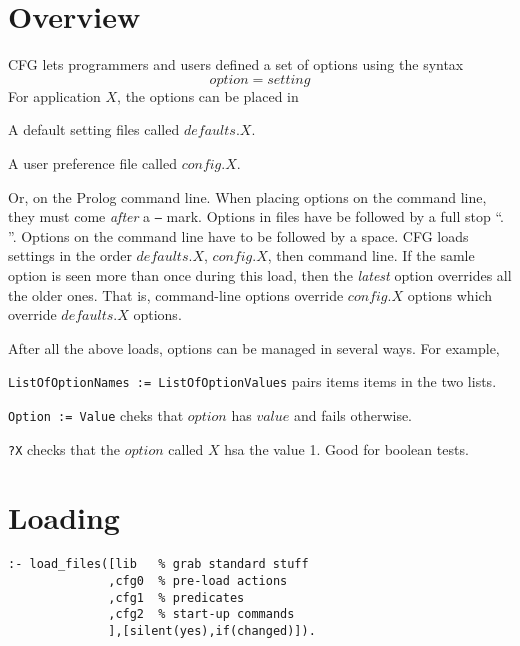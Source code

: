 \documentclass[twocolumn,global]{svjour}
\begin{document}
	 

\section{ Overview}

CFG lets programmers and users
defined a set of options using the syntax
\[
option = setting
\]
For application $X$, the options can be placed
in
\bi
\item
A default setting files called $defaults.X$.
\item
A user preference file called $config.X$.
\item
Or, on the  Prolog
command line. When placing options on the
command line, they must come {\em after}
a {\tt --} mark.
\ei Options in files have be followed by a
full stop ``. ''. Options on the command line
have to be followed by a space.
CFG loads settings in the order $defaults.X$,
	$config.X$, then command line.
If the samle option is seen more than once during
this load, then the {\em latest} option overrides
all the older ones. That is, command-line options
override $config.X$ options which override $defaults.X$
options.

After all the above loads, options can be managed
in several ways. For example,
\bd
\item[{\tt ListOfOptionNames := ListOfOptionValues}]
pairs items items in the two lists.
\item[{\tt Option := Value}]
cheks that $option$ has $value$ and fails otherwise.
\item[{\tt ?X}]
checks that the $option$ called $X$ hsa the value 1.
Good for boolean tests.
\ed

\section{Loading}
\begin{Verbatim}
:- load_files([lib   % grab standard stuff
              ,cfg0  % pre-load actions
              ,cfg1  % predicates
              ,cfg2  % start-up commands
              ],[silent(yes),if(changed)]).
\end{Verbatim}




\theend
\end{document}
